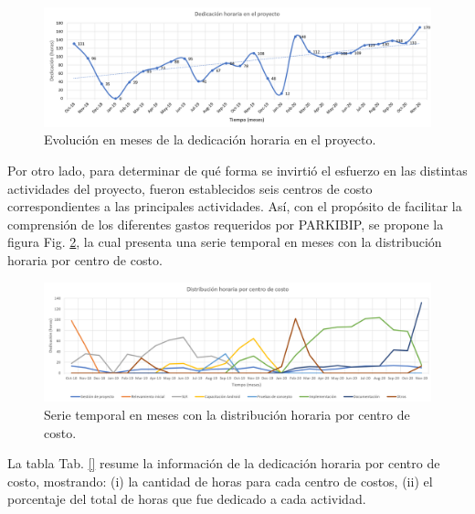 \begin{figure}[h!]
\hspace*{-2.9cm}%
\includegraphics[clip,width=1.4 \columnwidth]{TESIS/imagenes/chap07/dedication-parkibip.PNG}
\caption{Evolución en meses de la dedicación horaria en el proyecto.}
\label{fig:dedication}
\end{figure}

Por otro lado, para determinar de qué forma se invirtió el esfuerzo en las distintas actividades del proyecto, fueron establecidos seis centros de costo correspondientes a las principales actividades. Así, con el propósito de facilitar la comprensión de los diferentes gastos requeridos por PARKIBIP, se propone la figura Fig. \ref{fig:dedication-costs}, la cual presenta una serie temporal en meses con la distribución horaria por centro de costo. 

\begin{figure}[h!]
\hspace*{-2.9cm}%
\includegraphics[clip,width=1.4 \columnwidth]{TESIS/imagenes/chap07/dedication-costs.PNG}
\caption{Serie temporal en meses con la distribución horaria por centro de costo.}
\label{fig:dedication-costs}
\end{figure}

La tabla Tab. \ref{} resume la información de la dedicación horaria por centro de costo, mostrando: (i) la cantidad de horas para cada centro de costos, (ii) el porcentaje del total de horas que fue dedicado a cada actividad.

